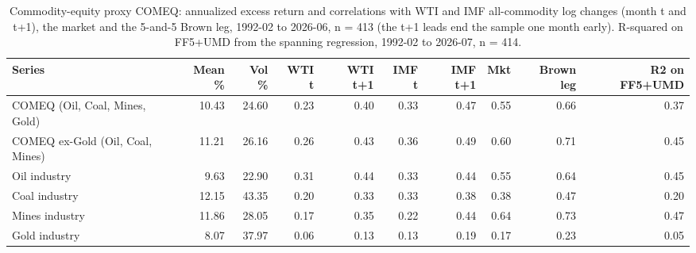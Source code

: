 \begin{table}
\caption{Commodity-equity proxy COMEQ: annualized excess return and correlations with WTI and IMF all-commodity log changes (month t and t+1), the market and the 5-and-5 Brown leg, 1992-02 to 2026-06, n = 413 (the t+1 leads end the sample one month early). R-squared on FF5+UMD from the spanning regression, 1992-02 to 2026-07, n = 414.}
\label{tab:m2_comeq}
\begin{tabular}{lrrrrrrrrr}
\toprule
Series & Mean \% & Vol \% & WTI t & WTI t+1 & IMF t & IMF t+1 & Mkt & Brown leg & R2 on FF5+UMD \\
\midrule
COMEQ (Oil, Coal, Mines, Gold) & 10.43 & 24.60 & 0.23 & 0.40 & 0.33 & 0.47 & 0.55 & 0.66 & 0.37 \\
COMEQ ex-Gold (Oil, Coal, Mines) & 11.21 & 26.16 & 0.26 & 0.43 & 0.36 & 0.49 & 0.60 & 0.71 & 0.45 \\
Oil industry & 9.63 & 22.90 & 0.31 & 0.44 & 0.33 & 0.44 & 0.55 & 0.64 & 0.45 \\
Coal industry & 12.15 & 43.35 & 0.20 & 0.33 & 0.33 & 0.38 & 0.38 & 0.47 & 0.20 \\
Mines industry & 11.86 & 28.05 & 0.17 & 0.35 & 0.22 & 0.44 & 0.64 & 0.73 & 0.47 \\
Gold industry & 8.07 & 37.97 & 0.06 & 0.13 & 0.13 & 0.19 & 0.17 & 0.23 & 0.05 \\
\bottomrule
\end{tabular}
\end{table}
